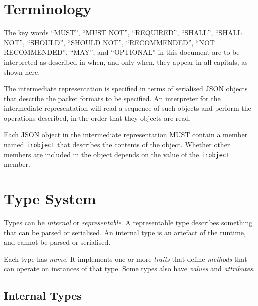 \documentclass[10pt,twocolumn,a4paper]{article}
\begin{document}


\section{Terminology}

The key words ``MUST'', ``MUST NOT'', ``REQUIRED'', ``SHALL'', ``SHALL
NOT'', ``SHOULD'', ``SHOULD NOT'', ``RECOMMENDED'', ``NOT RECOMMENDED'',
``MAY'', and ``OPTIONAL'' in this document are to be interpreted as
described in \cite{RFC2119,RFC8174} when, and only when, they appear
in all capitals, as shown here.



The intermediate representation is specified in terms of serialised JSON
\cite{RFC7159} objects that describe the packet formats to be specified.
An interpreter for the intermediate representation will read a sequence of
such objects and perform the operations described, in the order that they
objects are read.

Each JSON object in the intermediate representation MUST contain a member
named \texttt{irobject} that describes the contents of the object.
Whether other members are included in the object depends on the value of
the \texttt{irobject} member.

\section{Type System}

Types can be \emph{internal} or \emph{representable}. A representable type
describes something that can be parsed or serialised. An internal type is
an artefact of the runtime, and cannot be parsed or serialised.

Each type has \emph{name}. It implements one or more \emph{traits} that
define \emph{methods} that can operate on instances of that type. Some
types also have \emph{values} and \emph{attributes}.

\subsection{Internal Types}
\end{document}
